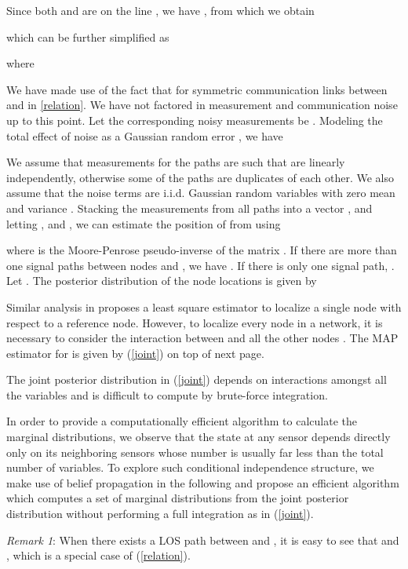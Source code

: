 \documentclass[10pt, twocolumn, final]{IEEEtran}
\begin{document}
Since both  and  are on the line , we have , from which we obtain

which can be further simplified as

where

We have made use of the fact that  for symmetric communication links between  and  in \eqref{relation}. We have not factored in measurement and communication noise up to this point. Let the corresponding noisy measurements be . Modeling the total effect of noise as a Gaussian random error , we have

We assume that measurements for the  paths are such that  are linearly independently, otherwise some of the paths are duplicates of each other. We also assume that the noise terms  are i.i.d. Gaussian random variables with zero mean and variance . Stacking the measurements from all  paths into a vector , and letting , and , we can estimate the position of  from  using

where  is the Moore-Penrose pseudo-inverse of the matrix . If there are more than one signal paths between nodes  and , we have . If there is only one signal path, . Let . The posterior distribution of the node locations is given by


Similar analysis in \cite{Seow2008} proposes a least square estimator to localize a single node with respect to a reference node. However, to localize every node in a network, it is necessary to consider the interaction between  and all the other nodes . The MAP estimator for  is given by (\ref{joint}) on top of next page.
\begin{figure*}[!t]
\setcounter{equation}{6}

\hrulefill
\end{figure*}
The joint posterior distribution in (\ref{joint}) depends on interactions amongst all the variables and is difficult to compute by brute-force integration.

In order to provide a computationally efficient algorithm to calculate the marginal distributions, we observe that the state at any sensor depends directly only on its neighboring sensors whose number is usually far less than the total number of variables. To explore such conditional independence structure, we make use of belief propagation in the following and propose an efficient algorithm which computes a set of marginal distributions from the joint posterior distribution without performing a full integration as in (\ref{joint}).

\emph{Remark 1}: When there exists a LOS path between  and , it is easy to see that  and , which is a special case of (\ref{relation}).
\end{document}
